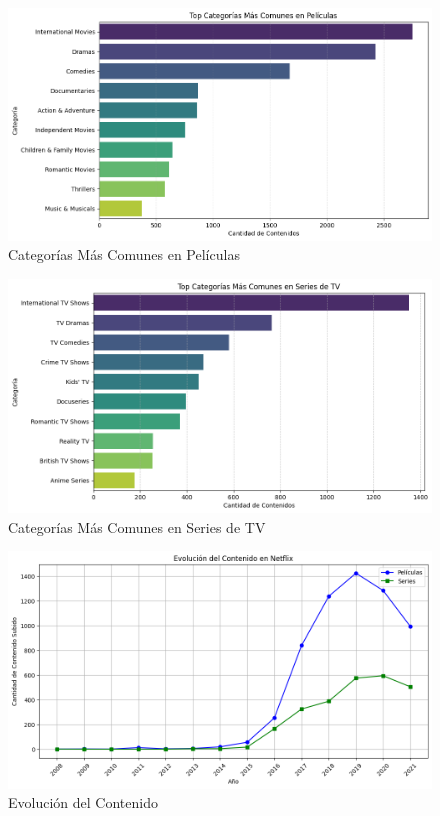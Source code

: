 \documentclass{article}
\begin{document}
\begin{figure}[H]
    \centering
    \includegraphics[width=\textwidth]{Graphs/categorias_peliculas.png}
    \caption{Categorías Más Comunes en Películas}
    \label{fig:categorías_peliculas}
\end{figure}

\begin{figure}[H]
    \centering
    \includegraphics[width=\textwidth]{Graphs/categorias_series.png}
    \caption{Categorías Más Comunes en Series de TV}
    \label{fig:categorías_series}
\end{figure}

\begin{figure}[H]
    \centering
    \includegraphics[width=\textwidth]{Graphs/evolucion_contenido.png}
    \caption{Evolución del Contenido}
    \label{fig:evolucion_contenido}
\end{figure}
\end{document}
